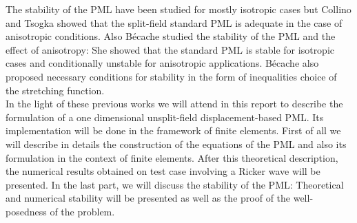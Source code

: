 The stability of the PML have been studied for mostly isotropic cases but Collino and Tsogka \cite{Collino} showed that the split-field standard PML is adequate in the case of anisotropic conditions. Also Bécache \cite{Becache} studied the stability of the PML and the effect of anisotropy: She showed that the standard PML is stable for isotropic cases and conditionally unstable for anisotropic applications. Bécache also proposed necessary conditions for stability in the form of inequalities choice of the stretching function.\\
In the light of these previous works we will attend in this report to describe the formulation of a one dimensional unsplit-field displacement-based PML. Its implementation will be done in the framework of finite elements. First of all we will describe in details the construction of the equations of the PML and also its formulation in the context of finite elements. After this theoretical description, the numerical results obtained on test case involving a Ricker wave will be presented. In the last part, we will discuss the stability of the PML: Theoretical and numerical stability will be presented as well as the proof of the well-posedness of the problem.   















